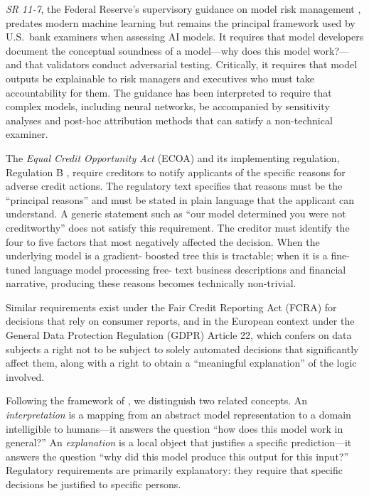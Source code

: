 \emph{SR 11-7}, the Federal Reserve's supervisory guidance on model risk management
\cite{sr117}, predates modern machine learning but remains the principal framework used
by U.S.\ bank examiners when assessing AI models. It requires that model developers
document the conceptual soundness of a model---why does this model work?---and that
validators conduct adversarial testing. Critically, it requires that model outputs be
explainable to risk managers and executives who must take accountability for them. The
guidance has been interpreted to require that complex models, including neural networks,
be accompanied by sensitivity analyses and post-hoc attribution methods that can satisfy
a non-technical examiner.

The \emph{Equal Credit Opportunity Act} (ECOA) and its implementing regulation, Regulation
B \cite{cfpb2013ecoa}, require creditors to notify applicants of the specific reasons for
adverse credit actions. The regulatory text specifies that reasons must be the
``principal reasons'' and must be stated in plain language that the applicant can
understand. A generic statement such as ``our model determined you were not creditworthy''
does not satisfy this requirement. The creditor must identify the four to five factors
that most negatively affected the decision. When the underlying model is a gradient-
boosted tree this is tractable; when it is a fine-tuned language model processing free-
text business descriptions and financial narrative, producing these reasons becomes
technically non-trivial.

Similar requirements exist under the Fair Credit Reporting Act (FCRA) for decisions that
rely on consumer reports, and in the European context under the General Data Protection
Regulation (GDPR) Article 22, which confers on data subjects a right not to be subject
to solely automated decisions that significantly affect them, along with a right to
obtain a ``meaningful explanation'' of the logic involved.

\begin{definition}
\label{def:explanation-vs-interpretation}
Following the framework of \citet{doshivelez2017rigorous}, we distinguish two related
concepts. An \emph{interpretation} is a mapping from an abstract model representation
to a domain intelligible to humans---it answers the question ``how does this model
work in general?'' An \emph{explanation} is a local object that justifies a specific
prediction---it answers the question ``why did this model produce this output for this
input?'' Regulatory requirements are primarily explanatory: they require that specific
decisions be justified to specific persons.
\end{definition}

